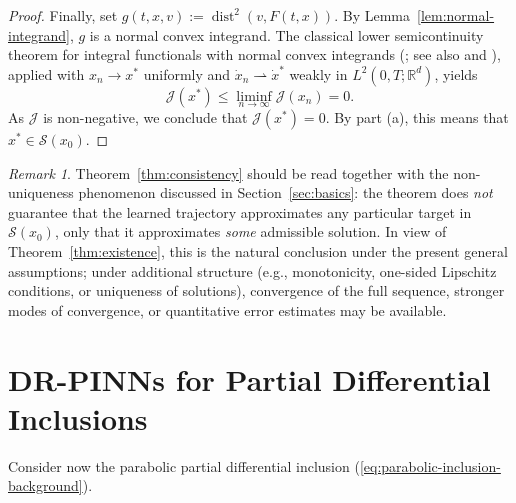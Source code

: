 \documentclass[11pt]{elsarticle}
\theoremstyle{definition}
\theoremstyle{remark}
\newtheorem{remark}[theorem]{Remark}
\numberwithin{equation}{section}
\begin{document}
\begin{proof}
		Finally, set $g(t, x, v) := \operatorname{dist}^2(v, F(t,x))$. 
		By Lemma~\ref{lem:normal-integrand}, $g$ is a normal convex integrand. The classical lower semicontinuity theorem for integral functionals with normal convex integrands (\cite[Theorem~1]{berkovitz_1974}; see also \cite{ioffe_1977} and \cite[Chapter~VIII]{ekeland_temam_1999}), applied with $x_n \to x^*$ uniformly and $\dot{x}_n \rightharpoonup \dot{x}^*$ weakly in $L^2(0,T;\mathbb{R}^d)$, yields
		\[
		\mathcal{J}(x^*) \le \liminf_{n \to \infty} \mathcal{J}(x_n) = 0.
		\]
		As $\mathcal{J}$ is non-negative, we conclude that $\mathcal{J}(x^*) = 0$. By part (a), this means that $x^* \in \mathcal{S}(x_0)$.
	\end{proof}
	
	\begin{remark}
		Theorem~\ref{thm:consistency} should be read together with the
		non-uniqueness phenomenon discussed in Section~\ref{sec:basics}: the
		theorem does \emph{not} guarantee that the learned trajectory
		approximates any particular target in $\mathcal{S}(x_0)$, only that it
		approximates \emph{some} admissible solution. In view of
		Theorem~\ref{thm:existence}, this is the natural conclusion under the
		present general assumptions; under additional structure (e.g.,
		monotonicity, one-sided Lipschitz conditions, or uniqueness of
		solutions), convergence of the full sequence, stronger modes of
		convergence, or quantitative error estimates may be available.
	\end{remark}
	
	
	\section{DR-PINNs for Partial Differential Inclusions}
	\label{sec:pde}
	
	Consider now the parabolic partial differential
	inclusion (\ref{eq:parabolic-inclusion-background}).
	
\end{document}
